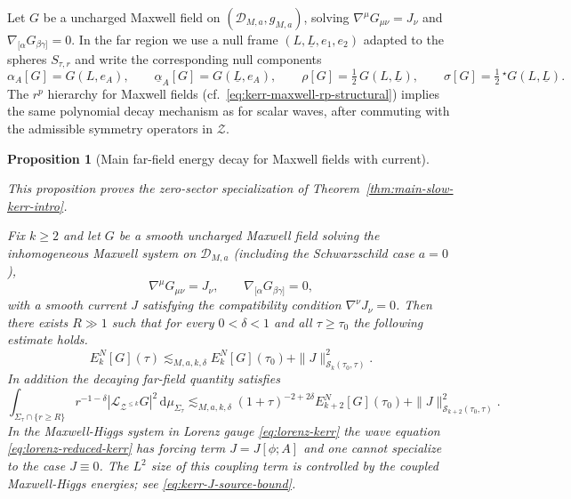 \documentclass[11pt]{article}
\numberwithin{equation}{section}
\theoremstyle{plain}
\newtheorem{proposition}[theorem]{Proposition}
\theoremstyle{definition}
\theoremstyle{remark}
\newcommand{\dd}{\mathrm{d}}
\begin{document}
Let $G$ be a uncharged Maxwell field on $(\mathcal D_{M,a},g_{M,a})$, solving
$\nabla^{\mu}G_{\mu\nu}=J_{\nu}$ and $\nabla_{[\alpha}G_{\beta\gamma]}=0$.
In the far region we use a null frame $(L,\underline L,e_{1},e_{2})$ adapted to the spheres $S_{\tau,r}$ and write the corresponding null components
\begin{equation}
\alpha_{A}[G]=G(L,e_{A}),\qquad
\underline{\alpha}_{A}[G]=G(\underline L,e_{A}),\qquad
\rho[G]=\tfrac12\,G(L,\underline L),\qquad
\sigma[G]=\tfrac12\,{}^{\star}G(L,\underline L).
\end{equation}
The $r^{p}$ hierarchy for Maxwell fields (cf.\ \eqref{eq:kerr-maxwell-rp-structural}) implies the same polynomial decay mechanism as for scalar waves, after commuting with the admissible symmetry operators in $\mathcal Z$.

\begin{proposition}[Main far-field energy decay for Maxwell fields with current]\label{prop:kerr-far-energy-decay-maxwell}

\noindent\emph{This proposition proves the zero-sector specialization of Theorem~\ref{thm:main-slow-kerr-intro}.}

Fix $k\ge 2$ and let $G$ be a smooth uncharged Maxwell field solving the inhomogeneous Maxwell system on $\mathcal D_{M,a}$ (including the Schwarzschild case $a=0$),
\begin{equation}
\nabla^{\mu}G_{\mu\nu}=J_{\nu},
\qquad
\nabla_{[\alpha}G_{\beta\gamma]}=0,
\end{equation}
with a smooth current $J$ satisfying the compatibility condition $\nabla^{\nu}J_{\nu}=0$.
Then there exists $R\gg1$ such that for every $0<\delta<1$ and all $\tau\ge\tau_{0}$ the following estimate holds.
\begin{equation}\label{eq:kerr-energy-decay-maxwell}
E^{N}_{k}[G](\tau)
\lesssim_{M,a,k,\delta}
E^{N}_{k}[G](\tau_{0})
+\|J\|_{\mathcal S_{k}(\tau_{0},\tau)}^{2}.
\end{equation}
In addition the decaying far-field quantity satisfies
\begin{equation}\label{eq:kerr-energy-decay-maxwell-weighted}
\int_{\Sigma_\tau\cap\{r\ge R\}}r^{-1-\delta}|\mathcal L_{\mathcal Z^{\le k}}G|^{2}\,\dd\mu_{\Sigma_\tau}
\lesssim_{M,a,k,\delta}
(1+\tau)^{-2+2\delta}E^{N}_{k+2}[G](\tau_0)
+\|J\|_{\mathcal S_{k+2}(\tau_0,\tau)}^{2}.
\end{equation}
In the Maxwell-Higgs system in Lorenz gauge \eqref{eq:lorenz-kerr} the wave equation \eqref{eq:lorenz-reduced-kerr} has forcing term $J=J[\phi;A]$ and one \emph{cannot} specialize to the case $J\equiv0$.
The $L^{2}$ size of this coupling term is controlled by the coupled Maxwell-Higgs energies; see \eqref{eq:kerr-J-source-bound}.
\end{proposition}
\end{document}
